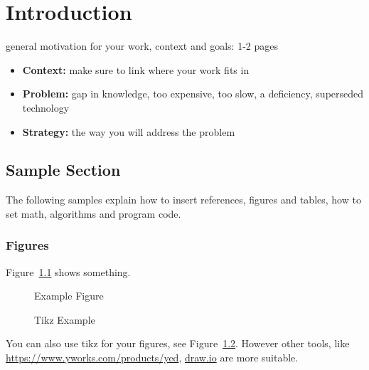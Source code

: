 \chapter{Introduction}
\label{sec:introduction}

general motivation for your work, context and goals: 1-2 pages

\begin{itemize}
    \item \textbf{Context:} make sure to link where your work fits in
    \item \textbf{Problem:} gap in knowledge, too expensive, too slow, a deficiency, superseded technology
    \item \textbf{Strategy:} the way you will address the problem
\end{itemize}


\section{Sample Section}

The following samples explain how to insert references, figures and tables, how to set math, algorithms and program code.


\begin{itemize}[align=left,leftmargin=*]
\end{itemize}

\subsection{Figures}

Figure~\ref{fig:ex1} shows something.

\begin{figure}
    \centering
    \caption{Example Figure}
    \label{fig:ex1}
\end{figure}

\begin{figure}
    \begin{center}
    \end{center}
    \caption{Tikz Example}
    \label{fig:ex2}
\end{figure}
You can also use tikz for your figures, see Figure~\ref{fig:ex2}.
However other tools, like \url{https://www.yworks.com/products/yed}, \url{draw.io} are more suitable.

